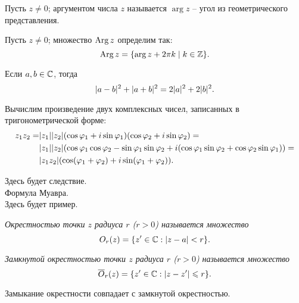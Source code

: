 \begin{note}
	Пусть $z \neq 0$; аргументом числа $z$ называется $\arg z$ -- угол из геометрического представления.
\end{note}
\begin{note}
	Пусть $z \neq 0$; множество $\operatorname{Arg} z$ определим так:
	\[
		\operatorname{Arg} z = \{ \arg z + 2 \pi k \mid k \in \mathbb{Z} \}.
	\]
\end{note}

\begin{corollary}
	Если $a, b \in \mathbb{C}$, тогда 
	\[
		\mathopen{}\left\lvert a - b\right\rvert\mathclose{}^2 + \mathopen{}\left\lvert a + b\right\rvert\mathclose{}^2 = 2 \mathopen{}\left\lvert a\right\rvert\mathclose{}^2 + 2 \mathopen{}\left\lvert b\right\rvert\mathclose{}^2.
	\]
\end{corollary}

\begin{example}
	Вычислим произведение двух комплексных чисел, записанных в тригонометрической форме:
	\[
		\begin{aligned}
			z_1 z_2 = & \mathopen{}\left\lvert z_1\right\rvert\mathclose{} \mathopen{}\left\lvert z_2\right\rvert\mathclose{} (\cos \varphi_1 + i \sin \varphi_1) (\cos \varphi_2 + i \sin \varphi_2) = \\
			& \mathopen{}\left\lvert z_1\right\rvert\mathclose{} \mathopen{}\left\lvert z_2\right\rvert\mathclose{} (\cos \varphi_1 \cos \varphi_2 - \sin \varphi_1 \sin \varphi_2 + i (\cos \varphi_1 \sin \varphi_2 + \cos \varphi_2 \sin \varphi_1)) = \\
			& \mathopen{}\left\lvert z_1 z_2\right\rvert\mathclose{} (\cos(\varphi_1 + \varphi_2) + i \sin(\varphi_1 + \varphi_2)).
		\end{aligned}
	\]
\end{example}

{\color{red} Здесь будет следствие.} \\

{\color{red} Формула Муавра.} \\

{\color{red} Здесь будет пример.} \\


\begin{definition}
	\it{Окрестностью точки} $z$ радиуса $r$ ($r > 0$) называется множество
	\[
		O_r(z) = \mathopen{}\left\{ z' \in \mathbb{C}: \mathopen{}\left\lvert z - a\right\rvert\mathclose{} < r \right\}\mathclose{}.
	\]
\end{definition}

\begin{definition}
	\it{Замкнутой окрестностью} точки $z$ радиуса $r$ ($r > 0$) называется множество
	\[
	{\overline O}_r(z) = \mathopen{}\left\{ z' \in \mathbb{C}: \mathopen{}\left\lvert z - z'\right\rvert\mathclose{} \leqslant r \right\}\mathclose{}.
	\]
\end{definition}
\begin{anote}
	Замыкание окрестности совпадает с замкнутой окрестностью.
\end{anote}


